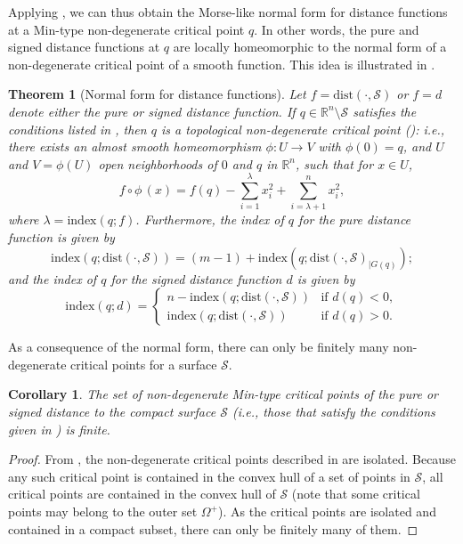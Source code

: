 \documentclass[11pt]{article}
\newcommand{\R}{\mathbb{R}}
\newcommand{\W}{\Omega}
\newcommand{\idx}{\mathrm{index}}
\newcommand{\dist}{\mathrm{dist}}
\newcommand{\Surf}{\mathcal{S}}
\theoremstyle{plain}
\newtheorem{thm}{Theorem}
\newtheorem{cor}{Corollary}
\theoremstyle{definition}
\theoremstyle{remark}
\begin{document}
	Applying , we can thus obtain the Morse-like normal form for distance functions at a Min-type non-degenerate critical point $q$. In other words, the pure and signed distance functions at $q$ are locally homeomorphic to the normal form of a non-degenerate critical point of a smooth function. This idea is illustrated in .
	
	\begin{thm}[Normal form for distance functions]
		\label{thm:normal_form_dist}
		Let $f = \dist(\cdot, \Surf)$ or $f = d$ denote either the pure or signed distance function. If $q \in \R^n \setminus \Surf$ satisfies the conditions listed in , then $q$ is a topological non-degenerate critical point (): i.e., there exists an almost smooth homeomorphism $\phi : U \to V$ with $\phi(0) = q$, and $U$ and $V = \phi(U)$ open neighborhoods of $0$ and $q$ in $\R^n$, such that for $x \in U$,
		\[ f \circ \phi \,(x) = f(q) - \sum_{i = 1}^{\lambda} x_i^2 + \sum_{i = \lambda + 1}^{n} x_i^2,\]
		where $\lambda = \idx(q; f)$. 
		Furthermore, the index of $q$ for the pure distance function is given by
		\begin{equation}
			\label{eq:idx_crit_pure}
			\idx{(q; \dist(\cdot, \Surf))} = (m-1) + \idx{(q; \dist(\cdot, \Surf)_{|G(q)})};
		\end{equation}
		and the index of $q$ for the signed distance function $d$ is given by
		\begin{equation}
			\idx(q;d) =	\begin{cases}
				n - \idx{(q; \dist(\cdot, \Surf))} &\text{if } d(q) < 0, \\
				\idx{(q; \dist(\cdot, \Surf))} &\text{if } d(q) > 0.
			\end{cases}
		\end{equation}
	\end{thm}
	
	As a consequence of the normal form, there can only be finitely many non-degenerate critical points for a surface $\Surf$. 
	
	\begin{cor} \label{cor:mintype_ndg_finite} The set of non-degenerate Min-type critical points of the pure or signed distance to the compact surface $\Surf$ (i.e., those that satisfy the conditions given in ) is finite. 
	\end{cor}
	
	\begin{proof}
		From , the non-degenerate critical points described in  are isolated. Because any such critical point is contained in the convex hull of a set of points in $\Surf$, all critical points are contained in the convex hull of $\Surf$ (note that some critical points may belong to the outer set $\W^+$). As the critical points are isolated and contained in a compact subset, there can only be finitely many of them.
	\end{proof}
	
\end{document}
